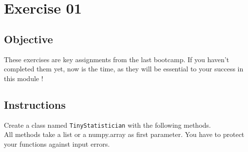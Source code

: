 \chapter{Exercise 01}
\makeheaderfilesforbidden

\section*{Objective}
These exercises are key assignments from the last bootcamp. If you haven't completed them yet, now is the time, as they will be essential to your success in this module !

\section*{Instructions}
Create a class named \texttt{TinyStatistician} with the following methods.\\
\newline
All methods take a list or a numpy.array as first parameter.
You have to protect your functions against input errors.

